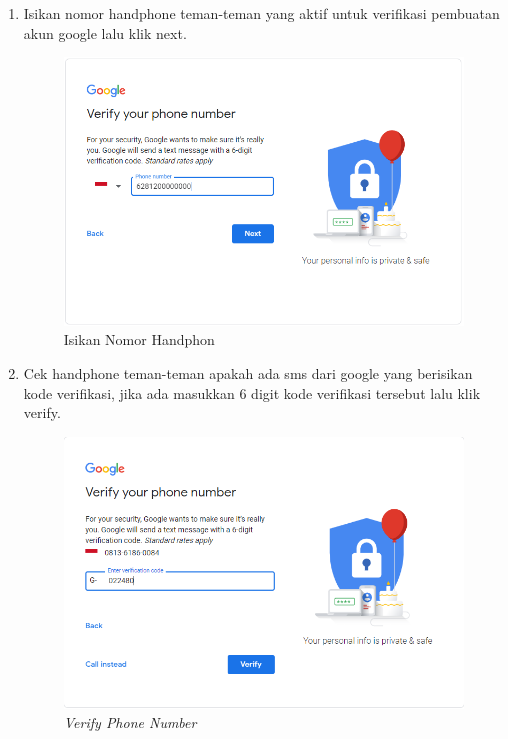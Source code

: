 \begin{enumerate}
\item Isikan nomor handphone teman-teman yang aktif untuk verifikasi pembuatan akun google lalu klik next.
\begin{figure}[H]
    \centering
    \includegraphics[scale=0.5]{figures/google3}
    \caption{Isikan Nomor Handphon}
    \label{google3}
\end{figure}

\item Cek handphone teman-teman apakah ada sms dari google yang berisikan kode verifikasi, jika ada masukkan 6 digit kode verifikasi tersebut lalu klik verify.
\begin{figure}[H]
    \centering
    \includegraphics[scale=0.5]{figures/google4}
    \caption{\textit{Verify Phone Number}}
    \label{google4}
\end{figure}


\end{enumerate}
